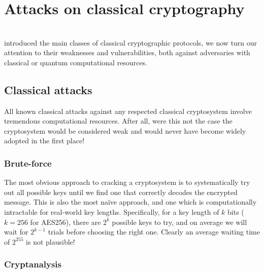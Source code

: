 %
%

\section{Attacks on classical cryptography}\label{sec:attacks_on_class}

\\

 introduced the main classes of classical cryptographic protocols, we now turn our attention to their weaknesses and vulnerabilities, both against adversaries with classical or quantum computational resources.

%
%

\subsection{Classical attacks}

All known classical attacks against any respected classical cryptosystem involve tremendous computational resources. After all, were this not the case the cryptosystem would be considered weak and would never have become widely adopted in the first place!

%
%

\subsubsection{Brute-force}\label{sec:brute_force_attack}

The most obvious approach to cracking a cryptosystem is to systematically try out all possible keys until we find one that correctly decodes the encrypted message. This is also the most na\"ive approach, and one which is computationally intractable for real-world key lengths. Specifically, for a key length of $k$ bits (\mbox{$k=256$} for AES256), there are $2^k$ possible keys to try, and on average we will wait for $2^{k-1}$ trials before choosing the right one. Clearly an average waiting time of $2^{255}$ is not plausible!

%
%

\subsubsection{Cryptanalysis}

